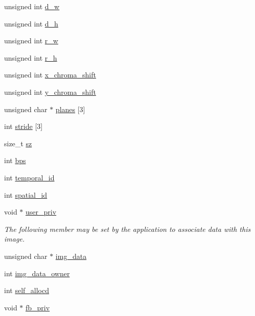 \begin{DoxyCompactItemize}
unsigned int \hyperlink{structaom__image_a89f80b1f58d608b9d2080635f4359034}{d\+\_\+w}
\item 
unsigned int \hyperlink{structaom__image_ab986419a1f0fff93a2dc505f47194988}{d\+\_\+h}
\item 
unsigned int \hyperlink{structaom__image_aa2365dc74ee71cded1a149e5d48d6c86}{r\+\_\+w}
\item 
unsigned int \hyperlink{structaom__image_aa996793ca8bfb0e6da05945898d39367}{r\+\_\+h}
\item 
unsigned int \hyperlink{structaom__image_a83fdb3677275dc0e1e38701000447214}{x\+\_\+chroma\+\_\+shift}
\item 
unsigned int \hyperlink{structaom__image_a5acfc850c272e1377f3b7d58a95f3749}{y\+\_\+chroma\+\_\+shift}
\item 
unsigned char $\ast$ \hyperlink{structaom__image_ac54dbc5237ca2914f9ec30105dfbe302}{planes} \mbox{[}3\mbox{]}
\item 
int \hyperlink{structaom__image_a6dc693d7dbc9eb06c0cdde307ca58372}{stride} \mbox{[}3\mbox{]}
\item 
size\+\_\+t \hyperlink{structaom__image_af0f6c220bf000d1c488075c19d889290}{sz}
\item 
int \hyperlink{structaom__image_a8b3396eaa38cbc62a90bfccd00b93b5a}{bps}
\item 
int \hyperlink{structaom__image_a11c7cb24c961e9bdcf25977a5dc53a40}{temporal\+\_\+id}
\item 
int \hyperlink{structaom__image_a1c3a59a1de1895da27135d04218f961a}{spatial\+\_\+id}
\item 
void $\ast$ \hyperlink{structaom__image_a522583fa7c1cda5ede3f65e9e574cf9f}{user\+\_\+priv}\hypertarget{structaom__image_a522583fa7c1cda5ede3f65e9e574cf9f}{}\label{structaom__image_a522583fa7c1cda5ede3f65e9e574cf9f}

\begin{DoxyCompactList}\small\item\em The following member may be set by the application to associate data with this image. \end{DoxyCompactList}\item 
unsigned char $\ast$ \hyperlink{structaom__image_a7c367f3227d5876ce9e5c198a01c2028}{img\+\_\+data}
\item 
int \hyperlink{structaom__image_ad29ed1ce3206c77ade67a76b69ee339e}{img\+\_\+data\+\_\+owner}
\item 
int \hyperlink{structaom__image_adcb959372df75813c6b1e01903ec3011}{self\+\_\+allocd}
\item 
void $\ast$ \hyperlink{structaom__image_aab189cb8d141a7b46102a913327398b3}{fb\+\_\+priv}
\end{DoxyCompactItemize}


